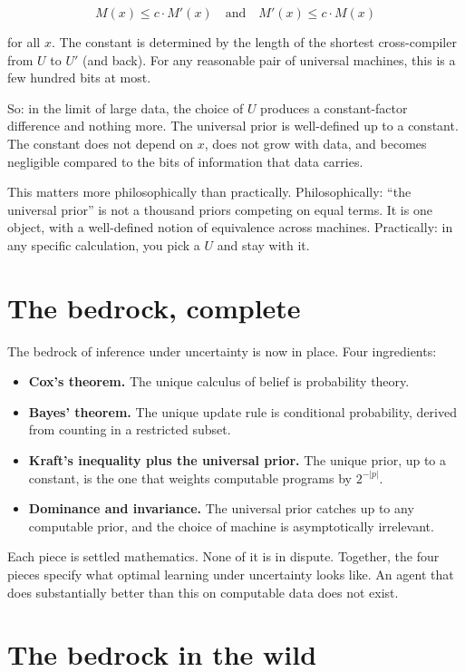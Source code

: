 $$M(x) \leq c \cdot M'(x) \quad \text{and} \quad M'(x) \leq c \cdot M(x)$$

for all $x$. The constant is determined by the length of the shortest cross-compiler from $U$ to $U'$ (and back). For any reasonable pair of universal machines, this is a few hundred bits at most.

So: in the limit of large data, the choice of $U$ produces a constant-factor difference and nothing more. The universal prior is well-defined up to a constant. The constant does not depend on $x$, does not grow with data, and becomes negligible compared to the bits of information that data carries.

This matters more philosophically than practically. Philosophically: ``the universal prior'' is not a thousand priors competing on equal terms. It is one object, with a well-defined notion of equivalence across machines. Practically: in any specific calculation, you pick a $U$ and stay with it.

\section*{The bedrock, complete}

The bedrock of inference under uncertainty is now in place. Four ingredients:

\begin{itemize}
\item \textbf{Cox's theorem.} The unique calculus of belief is probability theory.
\item \textbf{Bayes' theorem.} The unique update rule is conditional probability, derived from counting in a restricted subset.
\item \textbf{Kraft's inequality plus the universal prior.} The unique prior, up to a constant, is the one that weights computable programs by $2^{-|p|}$.
\item \textbf{Dominance and invariance.} The universal prior catches up to any computable prior, and the choice of machine is asymptotically irrelevant.
\end{itemize}

Each piece is settled mathematics. None of it is in dispute. Together, the four pieces specify what optimal learning under uncertainty looks like. An agent that does substantially better than this on computable data does not exist.

\section*{The bedrock in the wild}

